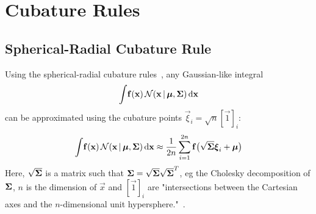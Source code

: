 \section{Cubature Rules}

\subsection{Spherical-Radial Cubature Rule}
	Using the spherical-radial cubature rules~\cite{solinCubatureIntegrationMethods2010}, any Gaussian-like integral
	\begin{equation*}
		\int\! \boldsymbol{\mathrm{f}}(\boldsymbol{\mathrm{x}}) \,\mathcal{N}(\boldsymbol{\mathrm{x}} \,\vert\, \boldsymbol{\mathrm{\mu}}, \boldsymbol{\mathrm{\Sigma}}) \dd{\boldsymbol{\mathrm{x}}}
	\end{equation*}
	can be approximated using the cubature points \( \vec{\xi}_i = \sqrt{n} [\vec{1}]_i \):
	\begin{equation}
		\int\! \boldsymbol{\mathrm{f}}(\boldsymbol{\mathrm{x}}) \,\mathcal{N}(\boldsymbol{\mathrm{x}} \,\vert\, \boldsymbol{\mathrm{\mu}}, \boldsymbol{\mathrm{\Sigma}}) \dd{\boldsymbol{\mathrm{x}}} \approx \frac{1}{2n} \sum_{i = 1}^{2n} \boldsymbol{\mathrm{f}}\big( \sqrt{\boldsymbol{\mathrm{\Sigma}}} \boldsymbol{\mathrm{\xi}}_i + \boldsymbol{\mathrm{\mu}} \big)  \label{eq:sphericalRadialGaussianCubatureRule}
	\end{equation}
	Here, \( \sqrt{\boldsymbol{\mathrm{\Sigma}}} \) is a matrix such that \( \boldsymbol{\mathrm{\Sigma}} = \sqrt{\boldsymbol{\mathrm{\Sigma}}} \sqrt{\boldsymbol{\mathrm{\Sigma}}}^T \), \ac{eg} the Cholesky decomposition of \(\boldsymbol{\mathrm{\Sigma}}\), \(n\) is the dimension of \(\vec{x}\) and \( [\vec{1}]_i \) are "intersections between the Cartesian axes and the \(n\)-dimensional unit hypersphere."~\cite{solinCubatureIntegrationMethods2010}.
